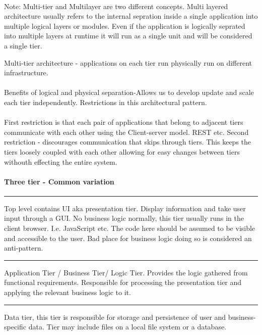 \documentclass[a4paper, 11pt]{book}
\begin{document}
    \paragraph{}
    Note: Multi-tier and Multilayer are two different concepts.
    Multi layered architecture usually refers to the internal sepration inside a single application into multiple logical layers or modules.
    Even if the application is logically seprated into multiple layers at runtime it will run as a single unit and will be considered a single tier.

    Multi-tier architecture - applications on each tier run physically run on different infrastructure.

    \paragraph{}
    Benefits of logical and physical separation-Allows us to develop update and scale each tier independently.
    Restrictions in this architectural pattern.

    \paragraph{}
    First restriction is that each pair of applications that belong to adjacent tiers communicate with each other using the Client-server model.
    REST etc.
    Second restriction - discourages communication that skips through tiers.
    This keeps the tiers loosely coupled with each other allowing for easy changes between tiers withouth effecting the entire system.

    \paragraph{Three tier - Common variation}
    \hrule
    Top level contains UI aka presentation tier.
    Display information and take user input through a GUI\@.
    No business logic normally, this tier usually runs in the client browser.
    I.e. JavaScript etc.
    The code here should be assumed to be visible and accessible to the user.
    Bad place for business logic doing so is considered an anti-pattern.
    \hrule
    Application Tier / Business Tier/ Logic Tier.
    Provides the logic gathered from functional requirements.
    Responsible for processing the presentation tier and applying the relevant business logic to it.
    \hrule
    Data tier, this tier is responsible for storage and persistence of user and business-specific data.
    Tier may include files on a local file system or a database.
\end{document}

